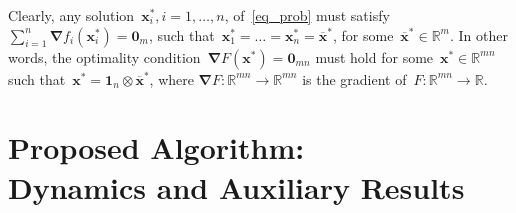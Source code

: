\documentclass[letterpaper, 10pt, conference]{ieeeconf}
\def\mb{\mathbf}
\def\mbb{\mathbb}
\begin{document}

Clearly, any solution~$\mb x_i^*,{i=1,\ldots,n}$, of~\eqref{eq_prob} must satisfy ${\sum_{i=1}^{n} \boldsymbol{ \nabla} f_i(\mb{x}^*_i) = \mb{0}_m}$, such that~${\mb{x}^*_1=\ldots=\mb{x}^*_n=\overline{\mb{x}}^*}$, for some~${\overline{\mb{x}}^*\in\mathbb{R}^m}$. In other words, the optimality condition~${\boldsymbol{ \nabla} F(\mb{x}^*) = \mb{0}_{mn}}$ must hold for some~${\mathbf x^*\in\mathbb{R}^{mn}}$ such that~${\mb{x}^*=\mb{1}_n \otimes \overline{ \mb{x}}^*}$, where ${\boldsymbol{\nabla} F:\mathbb R^{mn}\rightarrow\mathbb R^{mn}}$ is the gradient of~${F:\mbb R^{mn}\rightarrow\mbb R}$.

\section{Proposed Algorithm:\\ Dynamics and Auxiliary Results}\label{sec_dyn}
\end{document}
